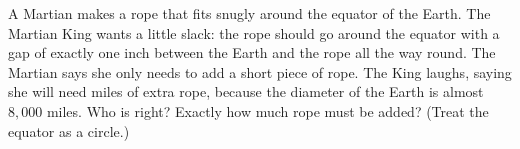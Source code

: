 A Martian makes a rope that fits snugly around the equator of the Earth. The Martian King wants a little slack: the rope should go around the equator with a gap of exactly one inch between the Earth and the rope all the way round. The Martian says she only needs to add a short piece of rope. The King laughs, saying she will need miles of extra rope, because the diameter of the Earth is almost $8{,}000$ miles. Who is right? Exactly how much rope must be added? (Treat the equator as a circle.)
